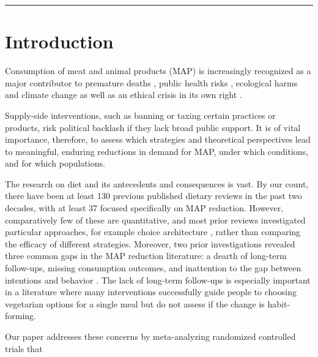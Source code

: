 \documentclass[sn-nature,referee,pdflatex]{sn-jnl}
\begin{document}
\maketitle

\begin{center}\rule{0.5\linewidth}{0.5pt}\end{center}

\section{Introduction}\label{sec1}

Consumption of meat and animal products (MAP) is increasingly recognized
as a major contributor to premature deaths
\citep{willett2019, landry2023}, public health risks
\citep{slingenbergh2004, graham2008}, ecological harms
\citep{greger2010} and climate change
\citep{scarborough2023, koneswaran2008} as well as an ethical crisis in
its own right \citep{kuruc2023, singer2023}.

Supply-side interventions, such as banning or taxing certain practices
or products, risk political backlash if they lack broad public support.
It is of vital importance, therefore, to assess which strategies and
theoretical perspectives lead to meaningful, enduring reductions in
demand for MAP, under which conditions, and for which populations.

The research on diet and its antecedents and consequences is vast. By
our count, there have been at least 130 previous published dietary
reviews in the past two decades, with at least 37 focused specifically
on MAP reduction. However, comparatively few of these are quantitative,
and most prior reviews investigated particular approaches, for example
choice architecture \citep{bianchi2018restructuring}, rather than
comparing the efficacy of different strategies. Moreover, two prior
investigations revealed three common gaps in the MAP reduction
literature: a dearth of long-term follow-ups, missing consumption
outcomes, and inattention to the gap between intentions and behavior
\citep{mathur2021meta, mathur2021effectiveness}. The lack of long-term
follow-ups is especially important in a literature where many
interventions successfully guide people to choosing vegetarian options
for a single meal \citep{hansen2021} but do not assess if the change is
habit-forming.

Our paper addresses these concerns by meta-analyzing randomized
controlled trials that
\end{document}
